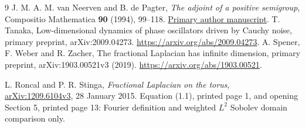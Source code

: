 \documentclass[11pt]{article}
\begin{document}
\begin{thebibliography}{9}
 J. M. A. M. van Neerven and B. de Pagter,
\emph{The adjoint of a positive semigroup}, Compositio Mathematica
\textbf{90} (1994), 99--118.
\href{https://fa.ewi.tudelft.nl/~neerven/publications/papers/Compos_Math_94.pdf}{Primary author manuscript}.
 T. Tanaka,
Low-dimensional dynamics of phase oscillators driven by
Cauchy noise, primary preprint, arXiv:2009.04273.
\url{https://arxiv.org/abs/2009.04273}.
 A. Spener, F. Weber and R. Zacher,
The fractional Laplacian has infinite dimension,
primary preprint, arXiv:1903.00521v3 (2019).
\url{https://arxiv.org/abs/1903.00521}.

 L. Roncal and P. R. Stinga,
\emph{Fractional Laplacian on the torus},
\href{https://arxiv.org/abs/1209.6104}{arXiv:1209.6104v3},
28 January 2015. Equation (1.1), printed page 1, and opening
Section 5, printed page 13: Fourier definition and weighted
$L^2$ Sobolev domain comparison only.
\end{thebibliography}
\end{document}
